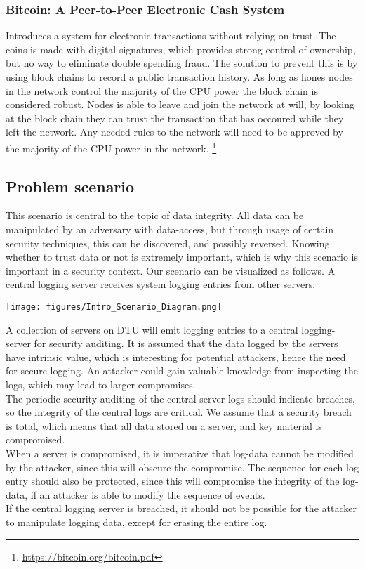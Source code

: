 \subsubsection{Bitcoin: A Peer-to-Peer Electronic Cash System}
Introduces a system for electronic transactions without relying on trust. The coins is made with digital signatures, which provides strong control of ownership, but no way to eliminate double spending fraud. The solution to prevent this is by using block chains to record a public transaction history. As long as hones nodes in the network control the majority of the CPU power the block chain is considered robust. Nodes is able to leave and join the network at will, by looking at the block chain they can trust the transaction that has occoured while they left the network. Any needed rules to the network will need to be approved by the majority of the CPU power in the network.  \footnote{\url{https://bitcoin.org/bitcoin.pdf}}
\newpage

\subsection{Problem scenario}

This scenario is central to the topic of data integrity. All data can be manipulated by an adversary with data-access, but through usage of certain security techniques, this can be discovered, and possibly reversed. Knowing whether to trust data or not is extremely important, which is why this scenario is important in a security context.
Our scenario can be visualized as follows. A central logging server receives system logging entries from other servers:
\\

\begin{center}
    \texttt{[image: figures/Intro\_Scenario\_Diagram.png]}
\end{center}

A collection of servers on DTU will emit logging entries to a central logging-server for security auditing. It is assumed that the data logged by the servers have intrinsic value, which is interesting for potential attackers, hence the need for secure logging. An attacker could gain valuable knowledge from inspecting the logs, which may lead to larger compromises.
\\The periodic security auditing of the central server logs should indicate breaches, so the integrity of the central logs are critical.
We assume that a security breach is total, which means that all data stored on a server, and key material is compromised.
\\When a server is compromised, it is imperative that log-data cannot be modified by the attacker, since this will obscure the compromise.
The sequence for each log entry should also be protected, since this will compromise the integrity of the log-data, if an attacker is able to modify the sequence of events.
\\If the central logging server is breached, it should not be possible for the attacker to manipulate logging data, except for erasing the entire log.

